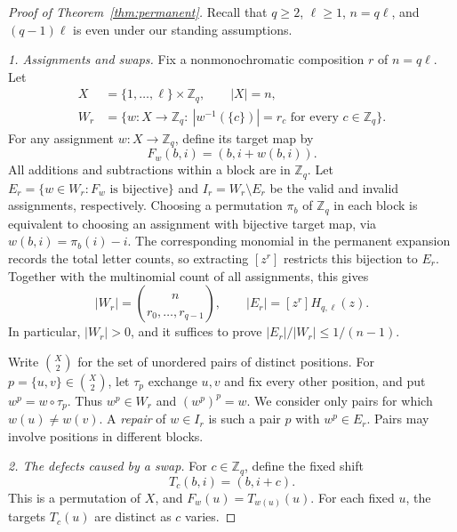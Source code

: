 \documentclass[11pt,a4paper]{article}
\numberwithin{equation}{section}
\numberwithin{figure}{section}
\numberwithin{table}{section}
\numberwithin{footnote}{section}
\theoremstyle{informal}\newtheorem*{informaltheorem}{Informal theorem}
\theoremstyle{definition}\newtheorem{example}{Example}[section]
\theoremstyle{remark}\newtheorem{remark}[theorem]{Remark}
\newcommand{\Z}{\mathbb Z}
\newcommand{\mult}[2]{\binom{#1}{#2}}
\begin{document}
\FloatBarrier
\begin{proof}[Proof of Theorem~\ref{thm:permanent}]
Recall that \(q\geq2\), \(\ell\geq1\), \(n=q\ell\), and
\((q-1)\ell\) is even under our standing assumptions.

\emph{1. Assignments and swaps.}
Fix a nonmonochromatic composition \(r\) of \(n=q\ell\).
Let
\begin{equation}
 \begin{aligned}
 X&=\{1,\ldots,\ell\}\times\Z_q,\qquad |X|=n,\\
 W_r&=\{w:X\to\Z_q:\ |w^{-1}(\{c\})|=r_c
                    \text{ for every }c\in\Z_q\}.
 \end{aligned}
\end{equation}
For any assignment \(w:X\to\Z_q\), define its target map by
\begin{equation}
 F_w(b,i)=(b,i+w(b,i)).
\end{equation}
All additions and subtractions within a block are in \(\Z_q\).
Let \(E_r=\{w\in W_r:F_w\text{ is bijective}\}\) and
\(I_r=W_r\setminus E_r\) be the valid and invalid assignments,
respectively. Choosing a permutation \(\pi_b\) of \(\Z_q\)
in each block is equivalent to choosing an assignment with bijective
target map, via \(w(b,i)=\pi_b(i)-i\). The corresponding monomial
in the permanent expansion records the total letter counts, so
extracting \([z^r]\) restricts this bijection to \(E_r\).
Together with the multinomial count of all assignments, this gives
\begin{equation}\label{eq:count}
 |W_r|=\mult n{r_0,\ldots,r_{q-1}},\qquad
 |E_r|=[z^r]H_{q,\ell}(z).
\end{equation}
In particular, \(|W_r|>0\), and it suffices to prove
\(|E_r|/|W_r|\leq1/(n-1)\).

Write \(\binom X2\) for the set of unordered pairs of distinct
positions. For \(p=\{u,v\}\in\binom X2\), let \(\tau_p\)
exchange \(u,v\) and fix every other position, and put
\(w^p=w\circ\tau_p\). Thus \(w^p\in W_r\) and
\((w^p)^p=w\). We consider only pairs for which \(w(u)\ne w(v)\).
A \emph{repair} of \(w\in I_r\) is such a pair \(p\) with
\(w^p\in E_r\). Pairs may involve positions in different blocks.

\emph{2. The defects caused by a swap.}
For \(c\in\Z_q\), define the fixed shift
\begin{equation}
 T_c(b,i)=(b,i+c).
\end{equation}
This is a permutation of \(X\), and
\(F_w(u)=T_{w(u)}(u)\). For each fixed \(u\), the targets
\(T_c(u)\) are distinct as \(c\) varies.


\end{proof}
\end{document}
